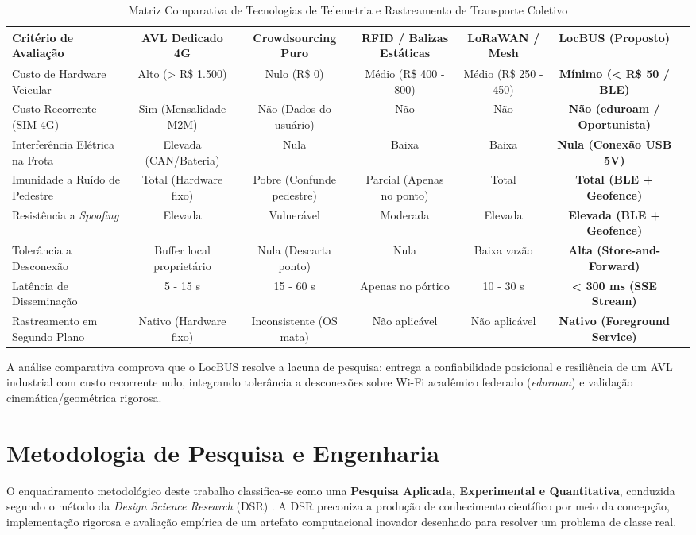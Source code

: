 \documentclass[lettersize,journal]{IEEEtran}
\begin{document}
\begin{table}[t]
\centering
\caption{Matriz Comparativa de Tecnologias de Telemetria e Rastreamento de Transporte Coletivo}
\label{tab_comparativo}
\begin{tabular}{lcccccc}
\toprule
\textbf{Critério de Avaliação} & \textbf{AVL Dedicado 4G} & \textbf{Crowdsourcing Puro} & \textbf{RFID / Balizas Estáticas} & \textbf{LoRaWAN / Mesh} & \textbf{LocBUS (Proposto)} \\
\midrule
Custo de Hardware Veicular & Alto (> R\$ 1.500) & Nulo (R\$ 0) & Médio (R\$ 400 - 800) & Médio (R\$ 250 - 450) & \textbf{Mínimo (< R\$ 50 / BLE)} \\
Custo Recorrente (SIM 4G) & Sim (Mensalidade M2M) & Não (Dados do usuário) & Não & Não & \textbf{Não (eduroam / Oportunista)} \\
Interferência Elétrica na Frota & Elevada (CAN/Bateria) & Nula & Baixa & Baixa & \textbf{Nula (Conexão USB 5V)} \\
Imunidade a Ruído de Pedestre & Total (Hardware fixo) & Pobre (Confunde pedestre) & Parcial (Apenas no ponto) & Total & \textbf{Total (BLE + Geofence)} \\
Resistência a \textit{Spoofing} & Elevada & Vulnerável & Moderada & Elevada & \textbf{Elevada (BLE + Geofence)} \\
Tolerância a Desconexão & Buffer local proprietário & Nula (Descarta ponto) & Nula & Baixa vazão & \textbf{Alta (Store-and-Forward)} \\
Latência de Disseminação & 5 - 15 s & 15 - 60 s & Apenas no pórtico & 10 - 30 s & \textbf{< 300 ms (SSE Stream)} \\
Rastreamento em Segundo Plano & Nativo (Hardware fixo) & Inconsistente (OS mata) & Não aplicável & Não aplicável & \textbf{Nativo (Foreground Service)} \\
\bottomrule
\end{tabular}
\end{table}

A análise comparativa comprova que o LocBUS resolve a lacuna de pesquisa: entrega a confiabilidade posicional e resiliência de um AVL industrial com custo recorrente nulo, integrando tolerância a desconexões sobre Wi-Fi acadêmico federado (\textit{eduroam}) e validação cinemática/geométrica rigorosa.

\section{Metodologia de Pesquisa e Engenharia}
O enquadramento metodológico deste trabalho classifica-se como uma \textbf{Pesquisa Aplicada, Experimental e Quantitativa}, conduzida segundo o método da \textit{Design Science Research} (DSR) \cite{ref_dsr_hevner}. A DSR preconiza a produção de conhecimento científico por meio da concepção, implementação rigorosa e avaliação empírica de um artefato computacional inovador desenhado para resolver um problema de classe real.
\end{document}
